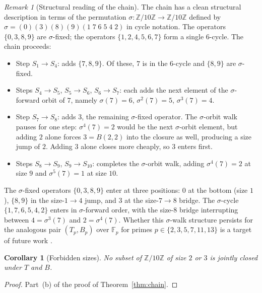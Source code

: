 \documentclass[11pt,reqno]{amsart}
\theoremstyle{plain}
\newtheorem{corollary}[theorem]{Corollary}
\theoremstyle{definition}
\theoremstyle{remark}
\newtheorem*{remark}{Remark}
\newcommand{\Z}{\mathbb{Z}}
\newcommand{\Zten}{\Z/10\Z}
\newcommand{\F}{\mathbb{F}}
\begin{document}
\begin{remark}[Structural reading of the chain]\label{rem:sigma-walk}
The chain has a clean structural description in terms of the
permutation $\sigma:\Zten\to\Zten$ defined by
$\sigma=(0)(3)(8)(9)(1\;7\;6\;5\;4\;2)$ in cycle notation. The
operators $\{0,3,8,9\}$ are $\sigma$-fixed; the operators
$\{1,2,4,5,6,7\}$ form a single $6$-cycle. The chain proceeds:
\begin{itemize}\setlength\itemsep{0pt}
\item Step $S_{1}\to S_{4}$: adds $\{7,8,9\}$. Of these, $7$ is
in the $6$-cycle and $\{8,9\}$ are $\sigma$-fixed.
\item Steps $S_{4}\to S_{5}$, $S_{5}\to S_{6}$, $S_{6}\to S_{7}$:
each adds the next element of the $\sigma$-forward orbit of $7$,
namely $\sigma(7)=6$, $\sigma^{2}(7)=5$, $\sigma^{3}(7)=4$.
\item Step $S_{7}\to S_{8}$: adds $3$, the remaining
$\sigma$-fixed operator. The $\sigma$-orbit walk pauses for one
step: $\sigma^{4}(7)=2$ would be the next $\sigma$-orbit element,
but adding $2$ alone forces $3=B(2,2)$ into the closure as well,
producing a size jump of $2$. Adding $3$ alone closes more
cheaply, so $3$ enters first.
\item Steps $S_{8}\to S_{9}$, $S_{9}\to S_{10}$: completes the
$\sigma$-orbit walk, adding $\sigma^{4}(7)=2$ at size $9$ and
$\sigma^{5}(7)=1$ at size $10$.
\end{itemize}
The $\sigma$-fixed operators $\{0,3,8,9\}$ enter at three
positions: $0$ at the bottom (size $1$), $\{8,9\}$ in the
size-$1\to 4$ jump, and $3$ at the size-$7\to 8$ bridge. The
$\sigma$-cycle $\{1,7,6,5,4,2\}$ enters in $\sigma$-forward
order, with the size-$8$ bridge interrupting between
$4=\sigma^{3}(7)$ and $2=\sigma^{4}(7)$. Whether this $\sigma$-walk
structure persists for the analogous pair $(T_{p},B_{p})$ over
$\F_{p}$ for primes $p\in\{2,3,5,7,11,13\}$ is a target of future
work \cite{SandersGish2026FpUniversality}.
\end{remark}

\begin{corollary}[Forbidden sizes]\label{cor:forbidden}
No subset of $\Zten$ of size $2$ or $3$ is jointly closed under
$T$ and $B$.
\end{corollary}

\begin{proof}
Part~(b) of the proof of Theorem~\ref{thm:chain}.
\end{proof}

\end{document}
